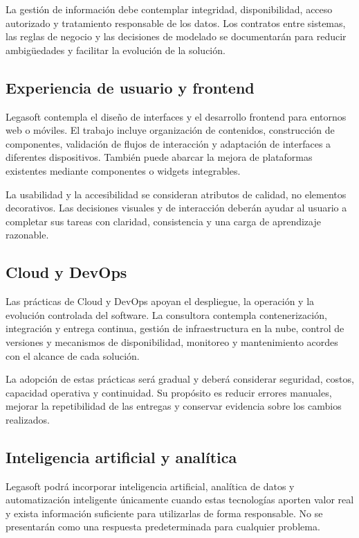 La gestión de información debe contemplar integridad, disponibilidad, acceso
autorizado y tratamiento responsable de los datos. Los contratos entre sistemas,
las reglas de negocio y las decisiones de modelado se documentarán para reducir
ambigüedades y facilitar la evolución de la solución.

\subsection{Experiencia de usuario y frontend}

Legasoft contempla el diseño de interfaces y el desarrollo frontend para entornos
web o móviles. El trabajo incluye organización de contenidos, construcción de
componentes, validación de flujos de interacción y adaptación de interfaces a
diferentes dispositivos. También puede abarcar la mejora de plataformas
existentes mediante componentes o widgets integrables.

La usabilidad y la accesibilidad se consideran atributos de calidad, no elementos
decorativos. Las decisiones visuales y de interacción deberán ayudar al usuario a
completar sus tareas con claridad, consistencia y una carga de aprendizaje
razonable.

\subsection{Cloud y DevOps}

Las prácticas de Cloud y DevOps apoyan el despliegue, la operación y la evolución
controlada del software. La consultora contempla contenerización, integración y
entrega continua, gestión de infraestructura en la nube, control de versiones y
mecanismos de disponibilidad, monitoreo y mantenimiento acordes con el alcance de
cada solución.

La adopción de estas prácticas será gradual y deberá considerar seguridad,
costos, capacidad operativa y continuidad. Su propósito es reducir errores
manuales, mejorar la repetibilidad de las entregas y conservar evidencia sobre
los cambios realizados.

\subsection{Inteligencia artificial y analítica}

Legasoft podrá incorporar inteligencia artificial, analítica de datos y
automatización inteligente únicamente cuando estas tecnologías aporten valor real
y exista información suficiente para utilizarlas de forma responsable. No se
presentarán como una respuesta predeterminada para cualquier problema.

